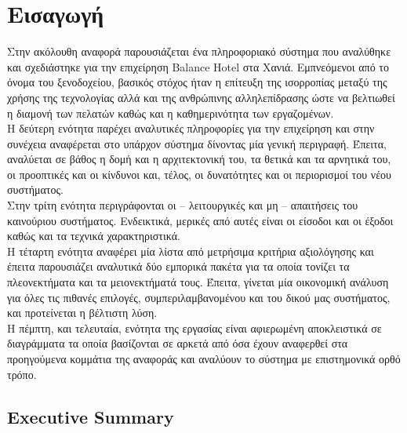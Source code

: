 \chapter{Εισαγωγή}

Στην ακόλουθη αναφορά παρουσιάζεται ένα πληροφοριακό σύστημα που 
αναλύθηκε και σχεδιάστηκε για την επιχείρηση Balance Hotel στα Χανιά. 
Εμπνεόμενοι από το όνομα του ξενοδοχείου, βασικός στόχος ήταν η επίτευξη 
της ισορροπίας μεταξύ της χρήσης της τεχνολογίας αλλά και της ανθρώπινης 
αλληλεπίδρασης ώστε να βελτιωθεί η διαμονή των πελατών καθώς και η 
καθημερινότητα των εργαζομένων.\\ 

\noindent
Η δεύτερη ενότητα παρέχει αναλυτικές πληροφορίες για την επιχείρηση 
και στην συνέχεια αναφέρεται στο υπάρχον σύστημα δίνοντας μία γενική 
περιγραφή. Έπειτα, αναλύεται σε βάθος η δομή και η αρχιτεκτονική του, τα 
θετικά και τα αρνητικά του, οι προοπτικές και οι κίνδυνοι και, τέλος, οι 
δυνατότητες και οι περιορισμοί του νέου συστήματος.\\

\noindent
Στην τρίτη ενότητα περιγράφονται οι – λειτουργικές και μη – απαιτήσεις 
του καινούριου συστήματος. Ενδεικτικά, μερικές από αυτές είναι οι είσοδοι 
και οι έξοδοι καθώς και τα τεχνικά χαρακτηριστικά.\\

\noindent
Η τέταρτη ενότητα αναφέρει μία λίστα από μετρήσιμα κριτήρια αξιολόγησης 
και έπειτα παρουσιάζει αναλυτικά δύο εμπορικά πακέτα για τα οποία τονίζει 
τα πλεονεκτήματα και τα μειονεκτήματά τους. Έπειτα, γίνεται μία οικονομική
ανάλυση για όλες τις πιθανές επιλογές, συμπεριλαμβανομένου και του δικού 
μας συστήματος, και προτείνεται η βέλτιστη λύση.\\

\noindent
Η πέμπτη, και τελευταία, ενότητα της εργασίας είναι αφιερωμένη αποκλειστικά 
σε διαγράμματα τα οποία βασίζονται σε αρκετά από όσα έχουν αναφερθεί στα 
προηγούμενα κομμάτια της αναφοράς και αναλύουν το σύστημα με 
επιστημονικά ορθό τρόπο.


\section{Εxecutive Summary}

